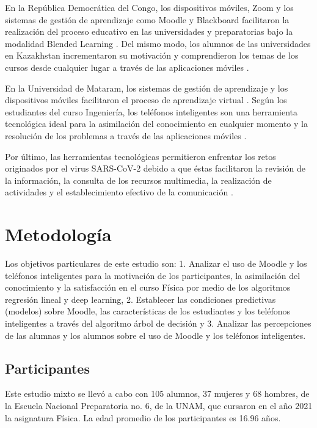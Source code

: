 \documentclass[spanish]{textolivre}
\begin{document}
En la República Democrática del Congo, los dispositivos móviles, Zoom y los sistemas de gestión de aprendizaje como Moodle y Blackboard facilitaron la realización del proceso educativo en las universidades y preparatorias bajo la modalidad Blended Learning \cite{kiketa_design_2022}. Del mismo modo, los alumnos de las universidades en Kazakhstan incrementaron su motivación y comprendieron los temas de los cursos desde cualquier lugar a través de las aplicaciones móviles \cite{rysbayeva_students_2022}.

En la Universidad de Mataram, los sistemas de gestión de aprendizaje y los dispositivos móviles facilitaron el proceso de aprendizaje virtual \cite{verawati_enhancing_2022}. Según los estudiantes del curso Ingeniería, los teléfonos inteligentes son una herramienta tecnológica ideal para la asimilación del conocimiento en cualquier momento y la resolución de los problemas a través de las aplicaciones móviles \cite{omirzak_students_2021}.

Por último, las herramientas tecnológicas permitieron enfrentar los retos originados por el virus SARS-CoV-2 debido a que éstas facilitaron la revisión de la información, la consulta de los recursos multimedia, la realización de actividades y el establecimiento efectivo de la comunicación \cite{galarce-miranda_analysis_2022, gormaz-lobos_evaluation_2021, stevanus_impact_2022}.


\section{Metodología}
Los objetivos particulares de este estudio son: 1. Analizar el uso de Moodle y los teléfonos inteligentes para la motivación de los participantes, la asimilación del conocimiento y la satisfacción en el curso Física por medio de los algoritmos regresión lineal y deep learning, 2. Establecer las condiciones predictivas (modelos) sobre Moodle, las características de los estudiantes y los teléfonos inteligentes a través del algoritmo árbol de decisión y 3. Analizar las percepciones de las alumnas y los alumnos sobre el uso de Moodle y los teléfonos inteligentes.

\subsection{Participantes}
Este estudio mixto se llevó a cabo con 105 alumnos, 37 mujeres y 68 hombres, de la Escuela Nacional Preparatoria no. 6, de la UNAM, que cursaron en el año 2021 la asignatura Física. La edad promedio de los participantes es 16.96 años.
\end{document}
